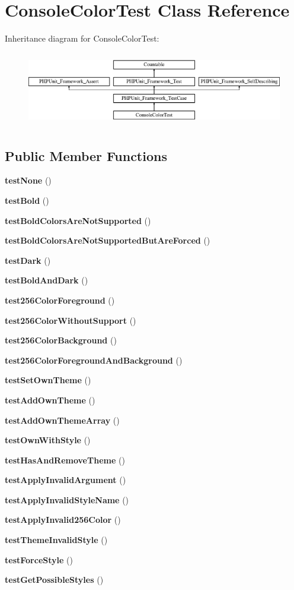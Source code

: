 \section{Console\+Color\+Test Class Reference}
\label{class_console_color_test}
Inheritance diagram for Console\+Color\+Test\+:\begin{figure}[H]
\begin{center}
\leavevmode
\includegraphics[height=3.303835cm]{class_console_color_test}
\end{center}
\end{figure}
\subsection*{Public Member Functions}
\begin{DoxyCompactItemize}
\item 
{\bf test\+None} ()
\item 
{\bf test\+Bold} ()
\item 
{\bf test\+Bold\+Colors\+Are\+Not\+Supported} ()
\item 
{\bf test\+Bold\+Colors\+Are\+Not\+Supported\+But\+Are\+Forced} ()
\item 
{\bf test\+Dark} ()
\item 
{\bf test\+Bold\+And\+Dark} ()
\item 
{\bf test256\+Color\+Foreground} ()
\item 
{\bf test256\+Color\+Without\+Support} ()
\item 
{\bf test256\+Color\+Background} ()
\item 
{\bf test256\+Color\+Foreground\+And\+Background} ()
\item 
{\bf test\+Set\+Own\+Theme} ()
\item 
{\bf test\+Add\+Own\+Theme} ()
\item 
{\bf test\+Add\+Own\+Theme\+Array} ()
\item 
{\bf test\+Own\+With\+Style} ()
\item 
{\bf test\+Has\+And\+Remove\+Theme} ()
\item 
{\bf test\+Apply\+Invalid\+Argument} ()
\item 
{\bf test\+Apply\+Invalid\+Style\+Name} ()
\item 
{\bf test\+Apply\+Invalid256\+Color} ()
\item 
{\bf test\+Theme\+Invalid\+Style} ()
\item 
{\bf test\+Force\+Style} ()
\item 
{\bf test\+Get\+Possible\+Styles} ()
\end{DoxyCompactItemize}
